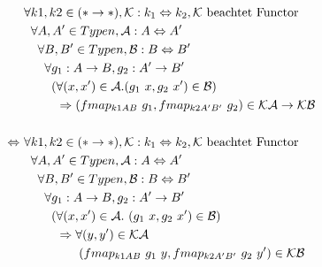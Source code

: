
\begin{align*}
&\forall k1, k2 \in (* \rightarrow *), \mathcal{K} : k_1 \Leftrightarrow k_2, \mathcal{K}~\text{beachtet Functor} \\
&\hphantom{\forall} \forall A, A' \in Typen, \mathcal{A} : A \Leftrightarrow A' \\
&\hphantom{\forall \forall} \forall B, B' \in Typen, \mathcal{B} : B \Leftrightarrow B' \\
&\hphantom{\forall \forall \forall} \forall g_1 : A \rightarrow B, g_2 : A' \rightarrow B' \\
&\hphantom{\forall \forall \forall \forall} (\forall (x, x') \in \mathcal{A}. (g_1\ x, g_2\ x') \in \mathcal{B})\\
&\hphantom{\forall \forall \forall \forall (} \Rightarrow (fmap_{k1 A B}\ g_1, fmap_{k2 A' B'}\ g_2) \in \mathcal{K} \mathcal{A} \rightarrow \mathcal{K} \mathcal{B} \\
&\\
\Leftrightarrow~ &\forall k1, k2 \in (* \rightarrow *), \mathcal{K} : k_1 \Leftrightarrow k_2, \mathcal{K}~\text{beachtet Functor} \\
&\hphantom{\forall} \forall A, A' \in Typen, \mathcal{A} : A \Leftrightarrow A' \\
&\hphantom{\forall \forall} \forall B, B' \in Typen, \mathcal{B} : B \Leftrightarrow B' \\
&\hphantom{\forall \forall \forall} \forall g_1 : A \rightarrow B, g_2 : A' \rightarrow B' \\
&\hphantom{\forall \forall \forall \forall} (\forall (x, x') \in \mathcal{A}.~ (g_1\ x, g_2\ x') \in \mathcal{B})\\
&\hphantom{\forall \forall \forall \forall (} \Rightarrow \forall (y, y') \in \mathcal{K} \mathcal{A} \\
&\hphantom{\forall \forall \forall \forall ( \Rightarrow \forall} (fmap_{k1 A B}\ g_1\ y, fmap_{k2 A' B'}\ g_2\ y') \in \mathcal{K} \mathcal{B}\\
\end{align*}


